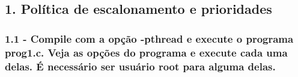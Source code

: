 \subsection*{1. Política de escalonamento e prioridades}

\subsubsection{1.1 - Compile com a opção -pthread e execute o programa prog1.c. Veja as opções do programa e execute cada uma delas. É necessário ser usuário root para alguma delas.}

\vspace{-0.5em}
\begin{minipage}{\textwidth}
  \hspace{1em}
  \centering
  
  \label{prog1}
  \hspace{1em}
\end{minipage}
\vspace{0.5em}

